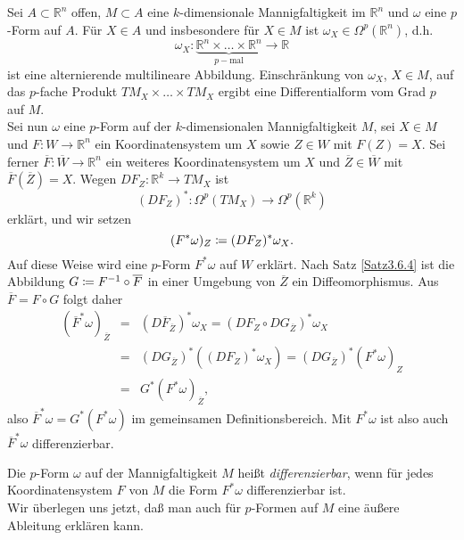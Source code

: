 \documentclass[a4paper,twoside,DIV15,BCOR12mm]{scrbook}
\begin{document}
 Sei $A \subset {\mathbb R}^{n}$ 
offen, $M\subset A$ eine $k$-dimensionale 
Mannigfaltigkeit im ${\mathbb R}^{n}$ und $\omega$ eine $p$-Form auf $A$. Für 
$X \in A$ und insbesondere für $X \in M$ ist $\omega_{X} \in 
\Omega^{p}({\mathbb R}^{n})$, d.h.
\[ \omega_{X}: \underbrace{{\mathbb R}^{n} \times \dots \times 
{\mathbb R}^{n}}_{p-\text{mal}} \to {\mathbb R} \]
ist eine alternierende multilineare Abbildung. Einschränkung von 
$\omega_{X}$, $X \in M$, auf das $p$-fache Produkt $TM_{X} \times \dots \times TM_{X}$ 
ergibt eine Differentialform vom Grad $p$ auf $M$.\\

\noindent
Sei nun $\omega$ eine $p$-Form auf der $k$-dimensionalen 
Mannigfaltigkeit $M$, sei $X \in M$ und $F: W \to {\mathbb R}^{n}$ 
ein Koordinatensystem um $X$ sowie $Z \in W$ mit $F(Z) = X$. Sei 
ferner $\overline{F}: \overline{W} \to {\mathbb R}^{n}$ ein weiteres 
Koordinatensystem um $X$ und $\overline{Z} \in \overline{W}$ mit 
$\overline{F}(\overline{Z}) = X$. Wegen $DF_{Z}: {\mathbb R}^{k} \to 
TM_{X}$ ist
\[ (DF_{Z})^{*}: \Omega^{p}(TM_{X}) \to \Omega^{p}({\mathbb R}^{k}) \]
erklärt, und wir setzen
\[ (F^{*}\omega)_{Z} \da  (DF_{Z})^{*} \omega_{X}. \]
Auf diese Weise wird eine $p$-Form $F^{*}\omega$ auf $W$ erklärt. 
Nach Satz \ref{Satz3.6.4} ist die Abbildung $G \da  F^{-1} \circ \overline{F}$ in 
einer Umgebung von $\overline{Z}$ ein Diffeomorphismus. Aus 
$\overline{F} = F \circ G$ folgt daher
\begin{eqnarray*}
(\overline{F}^{*}\omega)_{\overline{Z}} & = & 
(D\overline{F}_{\overline{Z}})^{*} \omega_{X} = (DF_{Z} \circ 
DG_{\overline{Z}})^{*} \omega_{X} \\
& = & (DG_{\overline{Z}})^{*} \left((DF_{Z})^{*} \omega_{X}\right) = 
(DG_{\overline{Z}})^{*} (F^{*} \omega)_{Z} \\
& = & G^{*} (F^{*} \omega)_{\overline{Z}},
\end{eqnarray*}
also $\overline{F}^{*}\omega = G^{*}(F^{*} \omega)$ im gemeinsamen 
Definitionsbereich. Mit $F^{*} \omega$ ist also auch 
$\overline{F}^{*} \omega$ differenzierbar.

\bigskip

 Die $p$-Form $\omega$ auf der 
Mannigfaltigkeit $M$ heißt {\em differenzierbar}, wenn für jedes 
Koordinatensystem $F$ von $M$ die Form $F^{*} \omega$ differenzierbar 
ist.\\

\noindent
Wir überlegen uns jetzt, daß man auch für $p$-Formen auf $M$ eine 
äußere Ableitung erklären kann.
\end{document}
